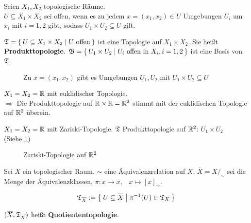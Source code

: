 \begin{definition}%
    Seien $X_1, X_2$ topologische Räume.\\
    $U \subseteq X_1 \times X_2$ sei offen, wenn es zu jedem $x = (x_1, x_2) \in U$
    Umgebungen $U_i$ um $x_i$  mit $i=1,2$ gibt, sodass $U_1 \times U_2 \subseteq U$
    gilt.

    $\mathfrak{T} = \Set{U \subseteq X_1 \times X_2 | U \text{ offen}}$
    ist eine Topologie auf $X_1 \times X_2$. Sie heißt \textbf{Produkttopologie}.
    $\mathfrak{B} = \Set{U_1 \times U_2 | U_i \text{ offen in } X_i, i=1,2}$
    ist eine Basis von $\mathfrak{T}$.
\end{definition}

\begin{figure}[htp]
    \centering
    
    \caption{Zu $x=(x_1, x_2)$ gibt es Umgebungen $U_1, U_2$ mit $U_1 \times U_2 \subseteq U$}
\end{figure}

\begin{beispiel}[Produkttopologien]
    \begin{bspenum}
        \item $X_1 = X_2 = \mathbb{R}$ mit euklidischer Topologie.\\
              $\Rightarrow$ Die Produkttopologie auf $\mathbb{R} \times \mathbb{R} = \mathbb{R}^2$
              stimmt mit der euklidischen Topologie auf $\mathbb{R}^2$ überein.
        \item $X_1 = X_2 = \mathbb{R}$ mit Zariski-Topologie.
              $\mathfrak{T}$ Produkttopologie auf $\mathbb{R}^2$: $U_1 \times U_2$\\
              (Siehe \cref{fig:zariski-topologie})
    \end{bspenum}

    \begin{figure}[htp]
        \centering
        
        \caption{Zariski-Topologie auf $\mathbb{R}^2$}
        \label{fig:zariski-topologie}
    \end{figure}
\end{beispiel}

\begin{definition}%
    Sei $X$ ein topologischer Raum, $\sim$ eine Äquivalenzrelation auf $X$,
    $\overline{X} = X /_\sim$ sei die Menge der Äquivalenzklassen,
    $\pi: x \rightarrow \overline{x}, \;\;\; x \mapsto [x]_\sim$.

    \[\mathfrak{T}_{\overline{X}} := \Set{U \subseteq \overline{X} | \pi^{-1}(U) \in \mathfrak{T}_X}\]

    $(\overline{X}, \mathfrak{T}_{\overline{X}})$ heißt \textbf{Quotiententopologie}.
\end{definition}

